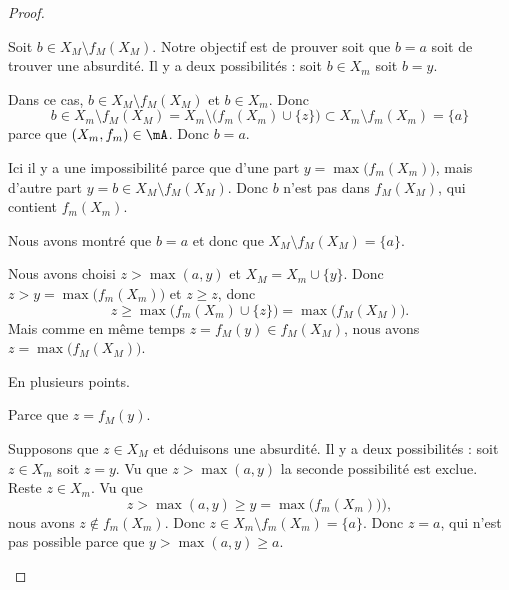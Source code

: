 \begin{proof}
\begin{subproof}
\begin{subproof}
			Soit \( b\in X_M\setminus f_M(X_M)\). Notre objectif est de prouver soit que \( b=a\) soit de trouver une absurdité. Il y a deux possibilités : soit \( b\in X_m\) soit \( b=y\).
			\begin{subproof}
				\spitem[Si \( b\in X_m\)]
				Dans ce cas, \( b\in X_M\setminus f_M(X_M)\) et \( b\in X_m\). Donc
				\begin{equation}
					b\in X_m\setminus f_M(X_M)=X_m\setminus \big( f_m(X_m)\cup \{ z \} \big)\subset X_m\setminus f_m(X_m)=\{a  \}
				\end{equation}
				parce que \( (X_m,f_m)\in\mA\). Donc \( b=a\).

				\spitem[Si \( b=y\)]
				Ici il y a une impossibilité parce que d'une part \( y=\max\big( f_m(X_m) \big)\), mais d'autre part \( y=b\in X_M\setminus f_M(X_M)\). Donc \( b\) n'est pas dans \( f_M(X_M)\), qui contient \( f_m(X_m)\).
			\end{subproof}
			Nous avons montré que \( b=a\) et donc que \( X_M\setminus f_M(X_M)=\{ a \}\).

			\spitem[\( z=\max\big( f_M(X_M) \big)\)]
			Nous avons choisi \( z>\max(a,y)\) et \( X_M=X_m\cup\{ y \}\). Donc \( z>y=\max\big( f_m(X_m) \big)\) et \( z\geq z\), donc
			\begin{equation}
				z\geq \max\big( f_m(X_m)\cup\{ z \} \big)=\max\big( f_M(X_M) \big).
			\end{equation}
			Mais comme en même temps \( z=f_M(y)\in f_M(X_M)\), nous avons \( z=\max\big( f_M(X_M) \big)\).

			\spitem[\( f_M(X_M)\setminus X_M=\lbrace z\rbrace\)]
			En plusieurs points.
			\begin{subproof}
				\spitem[\( z\in f_M(X_M)\)]
				Parce que \( z=f_M(y)\).

				\spitem[\( z\not\in X_M\)]
				Supposons que \( z\in X_M\) et déduisons une absurdité. Il y a deux possibilités : soit \( z\in X_m\) soit \( z=y\). Vu que \( z>\max(a,y)\) la seconde possibilité est exclue. Reste \( z\in X_m\). Vu que
				\begin{equation}
					z>\max(a,y)\geq y=\max\big( f_m(X_m) \big)),
				\end{equation}
				nous avons \( z\not\in f_m(X_m)\). Donc \( z\in X_m\setminus f_m(X_m)=\{ a \}\). Donc \( z=a\), qui n'est pas possible parce que \( y>\max(a,y)\geq a\).


\end{subproof}
\end{subproof}
\end{subproof}
\end{proof}
